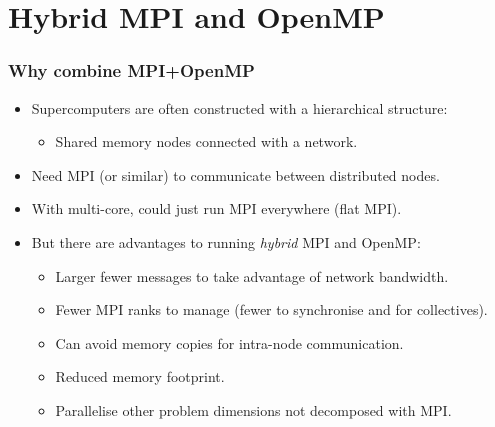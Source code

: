 \documentclass[aspectratio=169]{beamer}
\begin{document}
\section{Hybrid MPI and OpenMP}
\begin{frame}
\frametitle{Why combine MPI+OpenMP}
\begin{itemize}
  \item Supercomputers are often constructed with a hierarchical structure:
    \begin{itemize}
      \item Shared memory nodes connected with a network.
    \end{itemize}
  \item Need MPI (or similar) to communicate between distributed nodes.
  \item With multi-core, could just run MPI everywhere (flat MPI).
  \item But there are advantages to running \emph{hybrid} MPI and OpenMP:
    \begin{itemize}
      \item Larger fewer messages to take advantage of network bandwidth.
      \item Fewer MPI ranks to manage (fewer to synchronise and for collectives).
      \item Can avoid memory copies for intra-node communication.
      \item Reduced memory footprint.
      \item Parallelise other problem dimensions not decomposed with MPI.
    \end{itemize}
\end{itemize}
\end{frame}
\end{document}

